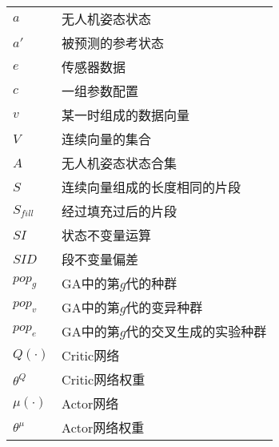\begin{tabular}{ll}
    $a$       &   无人机姿态状态\\
    $a'$ & 被预测的参考状态 \\
    $e$ &  传感器数据 \\
    $c$ & 一组参数配置 \\
    $v$ & 某一时组成的数据向量 \\
    $V$ & 连续向量的集合 \\
    $A$       &   无人机姿态状态合集\\
    $S$ & 连续向量组成的长度相同的片段 \\
    $S_{fill}$& 经过填充过后的片段 \\
    $SI$ & 状态不变量运算 \\ 
    $SID$ & 段不变量偏差 \\ 
    $pop_g$ & GA中的第$g$代的种群 \\
    $pop_v$ & GA中的第$g$代的变异种群 \\
    $pop_e$ & GA中的第$g$代的交叉生成的实验种群 \\
    $Q(\cdot)$ &  Critic网络 \\
    $\theta^{Q}$ & Critic网络权重\\
    $\mu (\cdot)$ & Actor网络 \\
    $\theta^{\mu}$ & Actor网络权重 \\
\end{tabular}